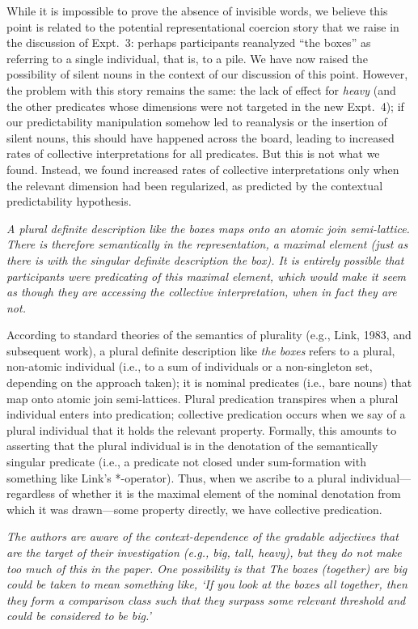 \documentclass[12pt]{article}
\begin{document}
While it is impossible to prove the absence of invisible words, we believe this point is related to the potential representational coercion story that we raise in the discussion of Expt.~3: perhaps participants reanalyzed ``the boxes'' as referring to a single individual, that is, to a pile. We have now raised the possibility of silent nouns in the context of our discussion of this point. However, the problem with this story remains the same: the lack of effect for \emph{heavy} (and the other predicates whose dimensions were not targeted in the new Expt.~4); if our predictability manipulation somehow led to reanalysis or the insertion of silent nouns, this should have happened across the board, leading to increased rates of collective interpretations for all predicates. But this is not what we found. Instead, we found increased rates of collective interpretations only when the relevant dimension had been regularized, as predicted by the contextual predictability hypothesis.

\item \emph{A plural definite description like \emph{the boxes} maps onto an atomic join semi-lattice. There is therefore semantically in the representation, a maximal element (just as there is with the singular definite description \emph{the box}). It is entirely possible that participants were predicating of this maximal element, which would make it seem as though they are accessing the collective interpretation, when in fact they are not.}

According to standard theories of the semantics of plurality (e.g., Link, 1983, and subsequent work), a plural definite description like \emph{the boxes} refers to a plural, non-atomic individual (i.e., to a sum of individuals or a non-singleton set, depending on the approach taken); it is nominal predicates (i.e., bare nouns) that map onto atomic join semi-lattices. Plural predication transpires when a plural individual enters into predication; collective predication occurs when we say of a plural individual that it holds the relevant property. Formally, this amounts to asserting that the plural individual is in the denotation of the semantically singular predicate (i.e., a predicate not closed under sum-formation with something like Link's *-operator). Thus, when we ascribe to a plural individual---regardless of whether it is the maximal element of the nominal denotation from which it was drawn---some property directly, we have collective predication.

\item \emph{The authors are aware of the context-dependence of the gradable adjectives that are the target of their investigation (e.g., \emph{big}, \emph{tall}, \emph{heavy}), but they do not make too much of this in the paper. One possibility is that \emph{The boxes (together) are big} could be taken to mean something like, `If you look at the boxes all together, then they form a comparison class such that they surpass some relevant threshold and could be considered to be big.'}
\end{document}
